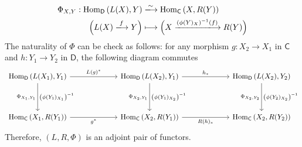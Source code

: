 {    \begin{align*}
        \Phi_{X,Y}:\mathrm{Hom}_{\mathsf{D}}\left(L(X),Y\right)&\xlongrightarrow{\sim} \mathrm{Hom}_{\mathsf{C}}\left(X,R(Y)\right)\\
        \Big(L(X)\xlongrightarrow{f}Y\Big)&\longmapsto \Big(X\xlongrightarrow{\left(\phi(Y)_X\right)^{-1}(f)}R(Y)\Big)
    \end{align*}
    The naturality of $\Phi$ can be check as follows: for any morphism $g:X_2\to X_1$ in $\mathsf{C}$ and $h:Y_1\to Y_2$ in $\mathsf{D}$, the following diagram commutes
    \[
        \begin{tikzcd}[ampersand replacement=\&]
            \mathrm{Hom}_{\mathsf{D}}\left(L(X_1),Y_1\right) \arrow[r, "L(g)^*"] \arrow[d, "\Phi_{X_1,Y_1}"', "\left(\phi(Y_1)_{X_1}\right)^{-1}"] \&[+40pt]\mathrm{Hom}_{\mathsf{D}}\left(L(X_2),Y_1\right) \arrow[r, "{h_*}"]\arrow[d, "\Phi_{X_2,Y_1}"', "\left(\phi(Y_1)_{X_2}\right)^{-1}"] \&[+40pt] \mathrm{Hom}_{\mathsf{D}}\left(L(X_2),Y_2\right) \arrow[d, "\Phi_{X_2,Y_2}"', "\left(\phi(Y_2)_{X_2}\right)^{-1}"] \\[+20pt]
            \mathrm{Hom}_{\mathsf{C}}\left(X_1,R(Y_1)\right) \arrow[r, "{g^*}"'] \&\mathrm{Hom}_{\mathsf{C}}\left(X_2,R(Y_1)\right) \arrow[r, "{R(h)_*}"']\& \mathrm{Hom}_{\mathsf{C}}\left(X_2,R(Y_2)\right)
        \end{tikzcd}
    \]
    Therefore, $(L,R,\Phi)$ is an adjoint pair of functors.
}

